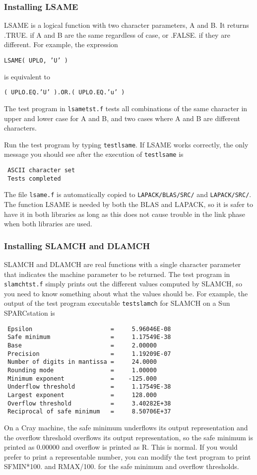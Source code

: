 \subsubsection{Installing LSAME}
\dent
LSAME is a logical function with two character parameters, A and B.
It returns .TRUE. if A and B are the same regardless of case, or .FALSE.
if they are different. 
For example, the expression

\begin{list}{}{} 
\item {\tt LSAME( UPLO, 'U' )}
\end{list}
\noindent 
is equivalent to
\begin{list}{}{} 
\item {\tt ( UPLO.EQ.'U' ).OR.( UPLO.EQ.'u' )}
\end{list} 
 
The test program in {\tt lsametst.f} tests all combinations of
the same character in upper and lower case for A and B, and two
cases where A and B are different characters.

Run the test program by typing {\tt testlsame}.
If LSAME works correctly, the only message you should see after the
execution of {\tt testlsame} is
\begin{verbatim}
 ASCII character set
 Tests completed
\end{verbatim}
The file {\tt lsame.f} is automatically copied to
{\tt LAPACK/BLAS/SRC/} and {\tt LAPACK/SRC/}. 
The function LSAME is needed by both the BLAS and LAPACK, so it is safer
to have it in both libraries as long as this does not cause trouble
in the link phase when both libraries are used.

\subsubsection{Installing SLAMCH and DLAMCH}
\dent
SLAMCH and DLAMCH are real functions with a single character parameter
that indicates the machine parameter to be returned.  The test 
program in {\tt slamchtst.f}
simply prints out the different values computed by SLAMCH,
so you need to know something about what the values should be. 
For example, the output of the test program executable {\tt testslamch}
for SLAMCH on a Sun SPARCstation is
\begin{verbatim}
 Epsilon                      =     5.96046E-08
 Safe minimum                 =     1.17549E-38
 Base                         =     2.00000
 Precision                    =     1.19209E-07
 Number of digits in mantissa =     24.0000
 Rounding mode                =     1.00000
 Minimum exponent             =    -125.000
 Underflow threshold          =     1.17549E-38
 Largest exponent             =     128.000
 Overflow threshold           =     3.40282E+38
 Reciprocal of safe minimum   =     8.50706E+37
\end{verbatim}
On a Cray machine, the safe minimum underflows its output
representation and the overflow threshold overflows its output
representation, so the safe minimum is printed as 0.00000 and overflow
is printed as R.  This is normal.
If you would prefer to print a representable number, you can modify
the test program to print SFMIN*100. and RMAX/100. for the safe
minimum and overflow thresholds.

